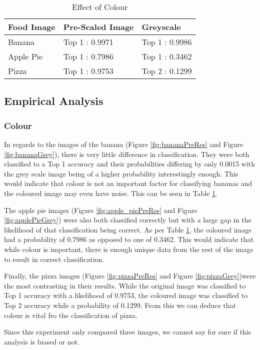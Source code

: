 \begin{table}[]
\centering
\caption{Effect of Colour}
\label{colour}
\begin{tabular}{|l|l|l|}
\hline
\textbf{Food Image} & \textbf{Pre-Scaled Image} & \textbf{Greyscale}      \\ \hline
Banana     & Top 1 : 0.9971   & Top 1 : 0.9986 \\ \hline
Apple Pie  & Top 1 : 0.7986   & Top 1 : 0.3462   \\ \hline
Pizza      & Top 1 : 0.9753   & Top 2 : 0.1299 \\ \hline
\end{tabular}
\end{table}

\subsection*{Empirical Analysis}
\subsubsection*{Colour}
In regards to the images of the banana (Figure \ref{fig:bananaPreRes} and Figure \ref{fig:bananaGrey}), there is very little difference in classification. They were both classified to a Top 1 accuracy and their probabilities differing by only 0.0015 with the grey scale image being of a higher probability interestingly enough. This would indicate that colour is not an important factor for classifying bananas and the coloured image may even have noise. This can be seen in Table \ref{colour}.

The apple pie images (Figure \ref{fig:apple_piePreRes} and Figure \ref{fig:applePieGrey}) were also both classified correctly but with a large gap in the likelihood of that classification being correct. As per Table \ref{colour}, the coloured image had a probability of 0.7986 as opposed to one of 0.3462. This would indicate that while colour is important, there is enough unique data from the rest of the image to result in correct classification.

Finally, the pizza images (Figure \ref{fig:pizzaPreRes} and Figure \ref{fig:pizzaGrey})were the most contrasting in their results. While the original image was classified to Top 1 accuracy with a likelihood of 0.9753, the coloured image was classified to Top 2 accuracy while a probability of 0.1299. From this we can deduce that colour is vital fro the classification of pizza.

Since this experiment only compared three images, we cannot say for sure if this analysis is biased or not.

